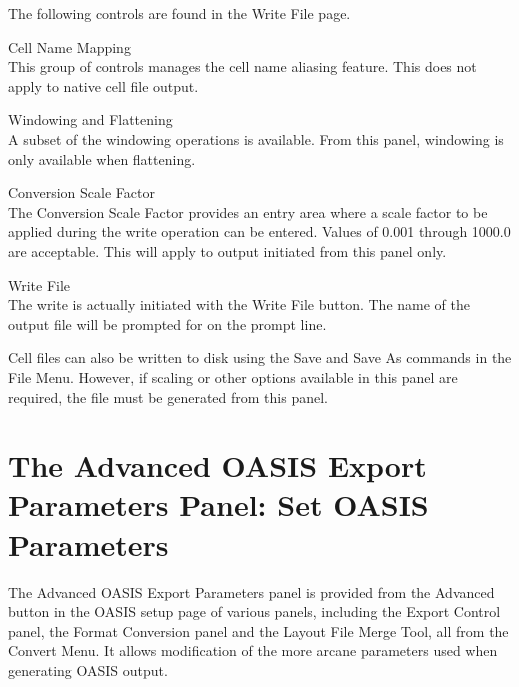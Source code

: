 The following controls are found in the {\cb Write File} page.

\begin{description}
\item{\cb Cell Name Mapping}\\
This group of controls manages the cell name aliasing feature.  This
does not apply to native cell file output.

\item{\cb Windowing and Flattening}\\
A subset of the windowing operations is available.  From this panel,
windowing is only available when flattening.

\item{\cb Conversion Scale Factor}\\
The {\cb Conversion Scale Factor} provides an entry area where a scale
factor to be applied during the write operation can be entered. 
Values of 0.001 through 1000.0 are acceptable.  This will apply to
output initiated from this panel only.

\item{Write File}\\
The write is actually initiated with the {\cb Write File} button.  The
name of the output file will be prompted for on the prompt line.

Cell files can also be written to disk using the {\cb Save} and {\cb
Save As} commands in the {\cb File Menu}.  However, if scaling or
other options available in this panel are required, the file must be
generated from this panel.
\end{description}


\section{The {\cb Advanced OASIS Export Parameters} Panel: Set\newline
  OASIS Parameters}
\label{oasadv}
The {\cb Advanced OASIS Export Parameters} panel is provided from the
{\cb Advanced} button in the {\cb OASIS} setup page of various panels,
including the {\cb Export Control} panel, the {\cb Format Conversion}
panel and the {\cb Layout File Merge Tool}, all from the {\cb Convert
Menu}.  It allows modification of the more arcane parameters used when
generating OASIS output.


